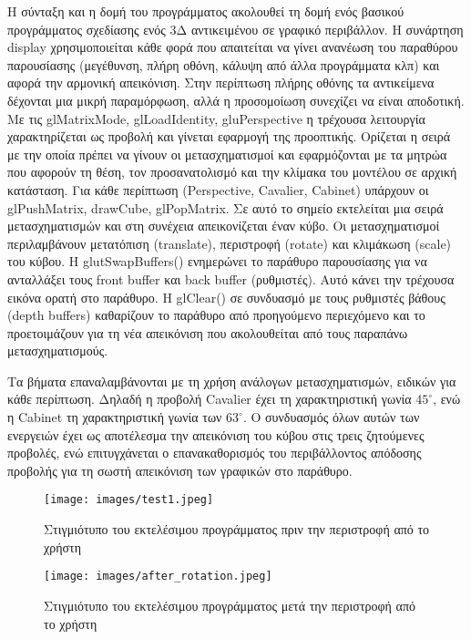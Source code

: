 Η σύνταξη και η δομή του προγράμματος ακολουθεί τη  δομή ενός βασικού προγράμματος σχεδίασης ενός 3Δ αντικειμένου σε γραφικό περιβάλλον. Η συνάρτηση display χρησιμοποιείται κάθε φορά που απαιτείται να γίνει ανανέωση του παραθύρου παρουσίασης (μεγέθυνση, πλήρη οθόνη, κάλυψη από άλλα προγράμματα κλπ) και αφορά την αρμονική απεικόνιση. Στην περίπτωση πλήρης οθόνης τα αντικείμενα δέχονται μια μικρή παραμόρφωση, αλλά η προσομοίωση συνεχίζει να είναι αποδοτική. 
Με τις glMatrixMode, glLoadIdentity, gluPerspective η τρέχουσα λειτουργία χαρακτηρίζεται ως προβολή και γίνεται εφαρμογή της προοπτικής. Ορίζεται η σειρά με την οποία πρέπει να γίνουν οι μετασχηματισμοί και εφαρμόζονται με τα μητρώα που αφορούν τη θέση, τον προσανατολισμό και την κλίμακα του μοντέλου σε αρχική κατάσταση.
Για κάθε περίπτωση (Perspective, Cavalier, Cabinet) υπάρχουν οι glPushMatrix, drawCube, glPopMatrix. Σε αυτό το σημείο εκτελείται μια σειρά μετασχηματισμών και στη συνέχεια απεικονίζεται έναν κύβο. Οι μετασχηματισμοί περιλαμβάνουν μετατόπιση (translate), περιστροφή (rotate) και κλιμάκωση (scale) του κύβου. Η glutSwapBuffers() ενημερώνει το παράθυρο παρουσίασης για να ανταλλάξει τους front buffer και back buffer (ρυθμιστές). Αυτό κάνει την τρέχουσα εικόνα ορατή στο παράθυρο. Η glClear() σε συνδυασμό με τους ρυθμιστές βάθους (depth buffers) καθαρίζουν το παράθυρο από προηγούμενο περιεχόμενο και το προετοιμάζουν για τη νέα απεικόνιση που ακολουθείται από τους παραπάνω μετασχηματισμούς. 

Τα βήματα επαναλαμβάνονται με τη χρήση ανάλογων μετασχηματισμών, ειδικών για κάθε περίπτωση. Δηλαδή η προβολή Cavalier έχει τη χαρακτηριστική γωνία  $45^\circ$, ενώ η Cabinet τη χαρακτηριστική γωνία των  $63^\circ$. Ο συνδυασμός όλων αυτών των ενεργειών έχει ως αποτέλεσμα την απεικόνιση του κύβου στις τρεις ζητούμενες προβολές, ενώ επιτυγχάνεται ο επανακαθορισμός του περιβάλλοντος απόδοσης προβολής για τη σωστή απεικόνιση των γραφικών στο παράθυρο.

\vspace{3em}
\begin{figure}[H]
    \texttt{[image: images/test1.jpeg]}
    \caption{Στιγμιότυπο του εκτελέσιμου προγράμματος πριν την περιστροφή από το χρήστη}    
\end{figure}
\begin{figure}[H]
    \texttt{[image: images/after\_rotation.jpeg]}
    \caption{Στιγμιότυπο του εκτελέσιμου προγράμματος μετά την περιστροφή από το χρήστη}        
\end{figure}
\par

